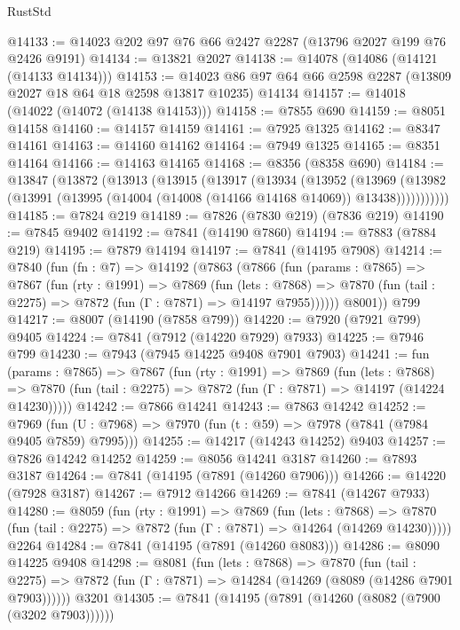 \begin{lexlean}{RustStd}
\begin{coremodule}
@14133 := @14023 @202 @97 @76 @66 @2427 @2287 (@13796 @2027 @199 @76 @2426 @9191)
@14134 := @13821 @2027
@14138 := @14078 (@14086 (@14121 (@14133 @14134)))
@14153 := @14023 @86 @97 @64 @66 @2598 @2287 (@13809 @2027 @18 @64 @18 @2598 @13817 @10235) @14134
@14157 := @14018 (@14022 (@14072 (@14138 @14153)))
@14158 := @7855 @690
@14159 := @8051 @14158
@14160 := @14157 @14159
@14161 := @7925 @1325
@14162 := @8347 @14161
@14163 := @14160 @14162
@14164 := @7949 @1325
@14165 := @8351 @14164
@14166 := @14163 @14165
@14168 := @8356 (@8358 @690)
@14184 := @13847
    (@13872
      (@13913
        (@13915
          (@13917
            (@13934
              (@13952
                (@13969
                  (@13982 (@13991 (@13995 (@14004 (@14008 (@14166 @14168 @14069)) @13438)))))))))))
@14185 := @7824 @219
@14189 := @7826 (@7830 @219) (@7836 @219)
@14190 := @7845 @9402
@14192 := @7841 (@14190 @7860)
@14194 := @7883 (@7884 @219)
@14195 := @7879 @14194
@14197 := @7841 (@14195 @7908)
@14214 := @7840
    (fun (fn : @7) =>
    @14192
      (@7863
        (@7866
          (fun (params : @7865) =>
          @7867
            (fun (rty : @1991) =>
            @7869
              (fun (lets : @7868) =>
              @7870 (fun (tail : @2275) => @7872 (fun (Γ : @7871) => @14197 @7955))))))
        @8001))
    @799
@14217 := @8007 (@14190 (@7858 @799))
@14220 := @7920 (@7921 @799) @9405
@14224 := @7841 (@7912 (@14220 @7929) @7933)
@14225 := @7946 @799
@14230 := @7943 (@7945 @14225 @9408 @7901 @7903)
@14241 := fun (params : @7865) =>
  @7867
    (fun (rty : @1991) =>
    @7869
      (fun (lets : @7868) =>
      @7870 (fun (tail : @2275) => @7872 (fun (Γ : @7871) => @14197 (@14224 @14230)))))
@14242 := @7866 @14241
@14243 := @7863 @14242
@14252 := @7969
    (fun (U : @7968) => @7970 (fun (t : @59) => @7978 (@7841 (@7984 @9405 @7859) @7995)))
@14255 := @14217 (@14243 @14252) @9403
@14257 := @7826 @14242 @14252
@14259 := @8056 @14241 @3187
@14260 := @7893 @3187
@14264 := @7841 (@14195 (@7891 (@14260 @7906)))
@14266 := @14220 (@7928 @3187)
@14267 := @7912 @14266
@14269 := @7841 (@14267 @7933)
@14280 := @8059
    (fun (rty : @1991) =>
    @7869
      (fun (lets : @7868) =>
      @7870 (fun (tail : @2275) => @7872 (fun (Γ : @7871) => @14264 (@14269 @14230)))))
    @2264
@14284 := @7841 (@14195 (@7891 (@14260 @8083)))
@14286 := @8090 @14225 @9408
@14298 := @8081
    (fun (lets : @7868) =>
    @7870
      (fun (tail : @2275) =>
      @7872 (fun (Γ : @7871) => @14284 (@14269 (@8089 (@14286 @7901 @7903))))))
    @3201
@14305 := @7841 (@14195 (@7891 (@14260 (@8082 (@7900 (@3202 @7903))))))

\end{coremodule}
\end{lexlean}
